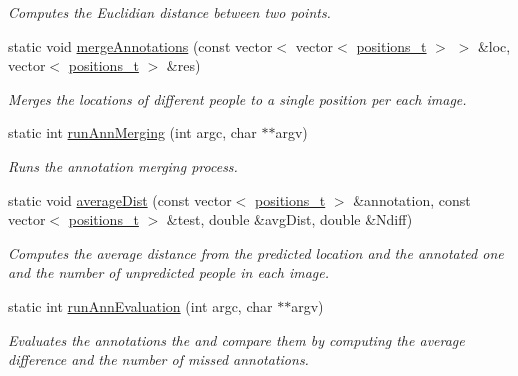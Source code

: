 \begin{DoxyCompactItemize}
\begin{DoxyCompactList}\small\item\em Computes the Euclidian distance between two points. \item\end{DoxyCompactList}\item 
\hypertarget{classAnnotatePos_a819badd48db3d4beb29c28def36a3da5}{
static void \hyperlink{classAnnotatePos_a819badd48db3d4beb29c28def36a3da5}{mergeAnnotations} (const vector$<$ vector$<$ \hyperlink{structpositions__t}{positions\_\-t} $>$ $>$ \&loc, vector$<$ \hyperlink{structpositions__t}{positions\_\-t} $>$ \&res)}
\label{classAnnotatePos_a819badd48db3d4beb29c28def36a3da5}

\begin{DoxyCompactList}\small\item\em Merges the locations of different people to a single position per each image. \item\end{DoxyCompactList}\item 
static int \hyperlink{classAnnotatePos_af4efeb69b6e9fb644e1d1ed50f102187}{runAnnMerging} (int argc, char $\ast$$\ast$argv)
\begin{DoxyCompactList}\small\item\em Runs the annotation merging process. \item\end{DoxyCompactList}\item 
\hypertarget{classAnnotatePos_ab1010c3159c1f5e9def374e4343fdf39}{
static void \hyperlink{classAnnotatePos_ab1010c3159c1f5e9def374e4343fdf39}{averageDist} (const vector$<$ \hyperlink{structpositions__t}{positions\_\-t} $>$ \&annotation, const vector$<$ \hyperlink{structpositions__t}{positions\_\-t} $>$ \&test, double \&avgDist, double \&Ndiff)}
\label{classAnnotatePos_ab1010c3159c1f5e9def374e4343fdf39}

\begin{DoxyCompactList}\small\item\em Computes the average distance from the predicted location and the annotated one and the number of unpredicted people in each image. \item\end{DoxyCompactList}\item 
static int \hyperlink{classAnnotatePos_abd906281e0124c66c0a1119ffa54944e}{runAnnEvaluation} (int argc, char $\ast$$\ast$argv)
\begin{DoxyCompactList}\small\item\em Evaluates the annotations the and compare them by computing the average difference and the number of missed annotations. \item\end{DoxyCompactList}\end{DoxyCompactItemize}
